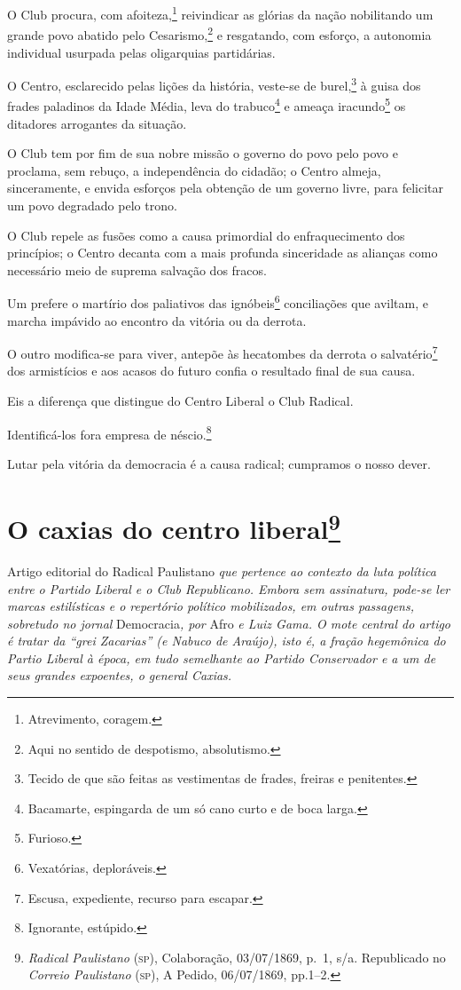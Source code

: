 O Club procura, com afoiteza,\footnote{Atrevimento, coragem.}
reivindicar as glórias da nação nobilitando um grande povo abatido pelo
Cesarismo,\footnote{Aqui no sentido de despotismo, absolutismo.} e
resgatando, com esforço, a autonomia individual usurpada pelas
oligarquias partidárias.

O Centro, esclarecido pelas lições da história, veste-se de
burel,\footnote{Tecido de que são feitas as vestimentas de frades,
  freiras e penitentes.} à guisa dos frades paladinos da Idade Média,
leva do trabuco\footnote{Bacamarte, espingarda de um só cano curto e
  de boca larga.} e ameaça iracundo\footnote{Furioso.} os ditadores
arrogantes da situação.

O Club tem por fim de sua nobre missão o governo do povo pelo povo e
proclama, sem rebuço, a independência do cidadão; o Centro almeja,
sinceramente, e envida esforços pela obtenção de um governo livre, para
felicitar um povo degradado pelo trono.

O Club repele as fusões como a causa primordial do enfraquecimento dos
princípios; o Centro decanta com a mais profunda sinceridade as alianças
como necessário meio de suprema salvação dos fracos.

Um prefere o martírio dos paliativos das ignóbeis\footnote{Vexatórias,
  deploráveis.} conciliações que aviltam, e marcha impávido ao encontro
da vitória ou da derrota.

O outro modifica-se para viver, antepõe às hecatombes da derrota o
salvatério\footnote{Escusa, expediente, recurso para escapar.} dos
armistícios e aos acasos do futuro confia o resultado final de sua
causa.

Eis a diferença que distingue do Centro Liberal o Club Radical.

Identificá-los fora empresa de néscio.\footnote{Ignorante, estúpido.}

Lutar pela vitória da democracia é a causa radical; cumpramos o nosso
dever.

\chapter{O caxias do centro liberal\footnote{\emph{Radical Paulistano}
  (\textsc{sp}), Colaboração, 03/07/1869, p.~1, s/a. Republicado no \emph{Correio
  Paulistano} (\textsc{sp}), A Pedido, 06/07/1869, pp.1--2.}}

\begin{didascalia}
Artigo editorial do Radical Paulistano \emph{que pertence ao contexto
da luta política entre o Partido Liberal e o Club Republicano. Embora
sem assinatura, pode-se ler marcas estilísticas e o repertório político
mobilizados, em outras passagens, sobretudo no jornal} Democracia\emph{,
por} Afro \emph{e Luiz Gama. O mote central do artigo é tratar da ``grei
Zacarias'' (e Nabuco de Araújo), isto é, a fração hegemônica do Partio
Liberal à época, em tudo semelhante ao Partido Conservador e a um de
seus grandes expoentes, o general Caxias.}
\end{didascalia}



